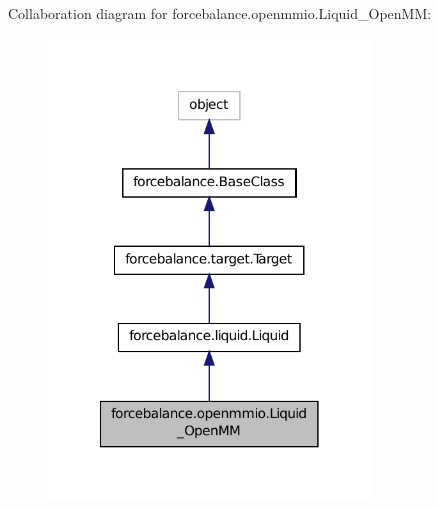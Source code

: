 Collaboration diagram for forcebalance.\-openmmio.\-Liquid\-\_\-\-Open\-M\-M\-:
\nopagebreak
\begin{figure}[H]
\begin{center}
\leavevmode
\includegraphics[width=242pt]{classforcebalance_1_1openmmio_1_1Liquid__OpenMM__coll__graph}
\end{center}
\end{figure}
